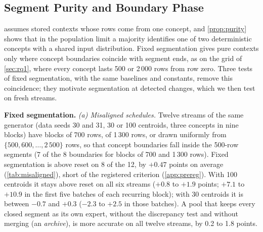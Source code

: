 \documentclass[11pt]{article}
\theoremstyle{plain}
\theoremstyle{definition}
\theoremstyle{remark}
\begin{document}
\subsection{Segment Purity and Boundary Phase}
\label{sec:rq2}

 assumes stored contexts whose rows come from one concept, and \cref{prop:purity} shows that
in the population limit a majority identifies one of two deterministic concepts with a shared input distribution. Fixed segmentation gives pure contexts only where concept boundaries coincide with segment ends, as
on the grid of \cref{sec:rq1}, where every concept lasts 500 or 2\,000 rows from row zero. Three tests of fixed
segmentation, with the same baselines and constants, remove this coincidence; they motivate segmentation at detected
changes, which we then test on fresh streams.

\textbf{Fixed segmentation.} \emph{(a) Misaligned schedules.} Twelve streams of the same generator (data seeds 30
and 31, 30 or 100 centroids, three concepts in nine blocks) have blocks of 700 rows, of 1\,300 rows, or drawn
uniformly from $\{500,600,\dots,2\,500\}$ rows, so that concept boundaries fall inside the 500-row segments (7 of the
8 boundaries for blocks of 700 and 1\,300 rows). Fixed segmentation is above reset on 8 of the 12, by $+0.47$ points
on average (\cref{tab:misaligned}), short of the registered criterion (\cref{app:prereg}). With 100 centroids it stays
above reset on all six streams ($+0.8$ to $+1.9$ points; $+7.1$ to $+10.9$ in the first five batches of each
recurring block); with 30 centroids it is between $-0.7$ and $+0.3$ ($-2.3$ to $+2.5$ in those batches). A pool that
keeps every closed segment as its own expert, without the discrepancy test and without merging (an
\emph{archive}), is more accurate on all twelve streams, by 0.2 to 1.8 points.
\end{document}

